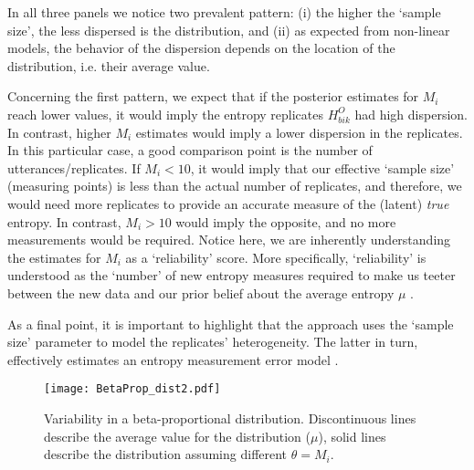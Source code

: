 In all three panels we notice two prevalent pattern: (i) the higher the `sample size', the less dispersed is the distribution, and (ii) as expected from non-linear models, the behavior of the dispersion depends on the location of the distribution, i.e. their average value.

Concerning the first pattern, we expect that if the posterior estimates for $M_{i}$ reach lower values, it would imply the entropy replicates $H^{O}_{bik}$ had high dispersion. In contrast, higher $M_{i}$ estimates would imply a lower dispersion in the replicates. In this particular case, a good comparison point is the number of utterances/replicates. If $M_{i}<10$, it would imply that our effective `sample size' (measuring points) is less than the actual number of replicates, and therefore, we would need more replicates to provide an accurate measure of the (latent) \textit{true} entropy. In contrast, $M_{i}>10$ would imply the opposite, and no more measurements would be required. Notice here, we are inherently understanding the estimates for $M_{i}$ as a `reliability' score. More specifically, `reliability' is understood as the `number' of new entropy measures required to make us teeter between the new data and our prior belief about the average entropy $\mu$ \cite{Kruschke_2015}.

\begin{comment}
	The value we choose for the prior $\theta$ can be thought of this way: It is the number of new flips of the coin that we would need to make us teeter between the new data and the prior belief about $\mu$. If we would only need a few new flips to sway our beliefs, then our prior beliefs should be represented by a small $\theta$. If we would need a large number of new flips to sway us away from our prior beliefs about $\mu$, then our prior beliefs are worth a very large $\theta$ \cite{Kruschke_2015}.
\end{comment}

As a final point, it is important to highlight that the approach uses the `sample size' parameter to model the replicates' heterogeneity. The latter in turn, effectively estimates an entropy measurement error model \cite{Carroll_2006}.
%
\begin{figure} [!h]
	\centering
	\texttt{[image: BetaProp\_dist2.pdf]}
	\caption[Variability in a beta-proportional distribution]{Variability in a beta-proportional distribution. Discontinuous lines describe the average value for the distribution ($\mu$), solid lines describe the distribution assuming different $\theta = M_{i}$.}
	\label{fig:BetaProp}
\end{figure}
%
%
